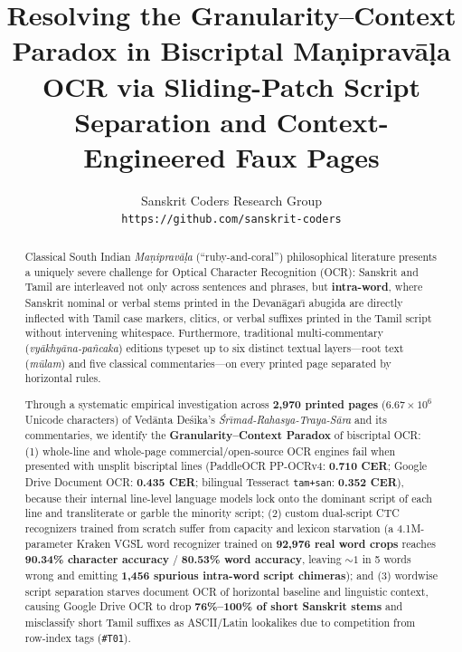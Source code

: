 \documentclass[10pt,twocolumn]{article}
\title{\textbf{Resolving the Granularity--Context Paradox in Biscriptal Ma\d{n}iprav\={a}\d{l}a OCR via Sliding-Patch Script Separation and Context-Engineered Faux Pages}}
\author{
  Sanskrit Coders Research Group \\
  \texttt{https://github.com/sanskrit-coders}
}
\date{}
\begin{document}
\maketitle

\begin{abstract}
Classical South Indian \emph{Ma\d{n}iprav\={a}\d{l}a} (``ruby-and-coral'') philosophical literature presents a uniquely severe challenge for Optical Character Recognition (OCR): Sanskrit and Tamil are interleaved not only across sentences and phrases, but \textbf{intra-word}, where Sanskrit nominal or verbal stems printed in the Devan\={a}gar\={\i} abugida are directly inflected with Tamil case markers, clitics, or verbal suffixes printed in the Tamil script without intervening whitespace. Furthermore, traditional multi-commentary (\emph{vy\={a}khy\={a}na-pa\~{n}caka}) editions typeset up to six distinct textual layers---root text (\emph{m\={u}lam}) and five classical commentaries---on every printed page separated by horizontal rules.

Through a systematic empirical investigation across \textbf{2,970 printed pages} ($6.67\times 10^6$ Unicode characters) of Ved\={a}nta De\'{s}ika's \emph{\'{S}r\={\i}mad-Rahasya-Traya-S\={a}ra} and its commentaries, we identify the \textbf{Granularity--Context Paradox} of biscriptal OCR: (1) whole-line and whole-page commercial/open-source OCR engines fail when presented with unsplit biscriptal lines (PaddleOCR PP-OCRv4: \textbf{0.710 CER}; Google Drive Document OCR: \textbf{0.435 CER}; bilingual Tesseract \texttt{tam+san}: \textbf{0.352 CER}), because their internal line-level language models lock onto the dominant script of each line and transliterate or garble the minority script; (2) custom dual-script CTC recognizers trained from scratch suffer from capacity and lexicon starvation (a 4.1M-parameter Kraken VGSL word recognizer trained on \textbf{92,976 real word crops} reaches \textbf{90.34\% character accuracy} / \textbf{80.53\% word accuracy}, leaving $\sim 1$ in 5 words wrong and emitting \textbf{1,456 spurious intra-word script chimeras}); and (3) wordwise script separation starves document OCR of horizontal baseline and linguistic context, causing Google Drive OCR to drop \textbf{76\%--100\% of short Sanskrit stems} and misclassify short Tamil suffixes as ASCII/Latin lookalikes due to competition from row-index tags (\texttt{\#T01}).


\end{abstract}
\end{document}
